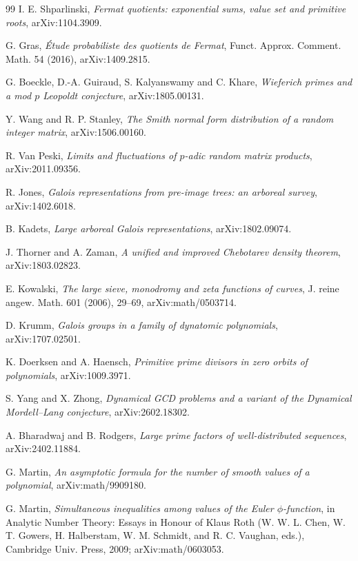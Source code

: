 \documentclass[11pt]{article}
\theoremstyle{definition}
\begin{document}
\begin{thebibliography}{99}
 I. E. Shparlinski,
\emph{Fermat quotients: exponential sums, value set and primitive roots},
arXiv:1104.3909.

 G. Gras,
\emph{\'Etude probabiliste des quotients de Fermat},
Funct. Approx. Comment. Math. 54 (2016), arXiv:1409.2815.

 G. Boeckle, D.-A. Guiraud, S. Kalyanswamy and C. Khare,
\emph{Wieferich primes and a mod $p$ Leopoldt conjecture}, arXiv:1805.00131.

 Y. Wang and R. P. Stanley,
\emph{The Smith normal form distribution of a random integer matrix}, arXiv:1506.00160.

 R. Van Peski,
\emph{Limits and fluctuations of $p$-adic random matrix products}, arXiv:2011.09356.

 R. Jones,
\emph{Galois representations from pre-image trees: an arboreal survey},
arXiv:1402.6018.

 B. Kadets,
\emph{Large arboreal Galois representations}, arXiv:1802.09074.

 J. Thorner and A. Zaman,
\emph{A unified and improved Chebotarev density theorem}, arXiv:1803.02823.

 E. Kowalski,
\emph{The large sieve, monodromy and zeta functions of curves},
J. reine angew. Math. 601 (2006), 29--69, arXiv:math/0503714.

 D. Krumm,
\emph{Galois groups in a family of dynatomic polynomials}, arXiv:1707.02501.

 K. Doerksen and A. Haensch,
\emph{Primitive prime divisors in zero orbits of polynomials}, arXiv:1009.3971.

 S. Yang and X. Zhong,
\emph{Dynamical GCD problems and a variant of the Dynamical Mordell--Lang conjecture},
arXiv:2602.18302.

 A. Bharadwaj and B. Rodgers,
\emph{Large prime factors of well-distributed sequences}, arXiv:2402.11884.

 G. Martin,
\emph{An asymptotic formula for the number of smooth values of a polynomial},
arXiv:math/9909180.

 G. Martin,
\emph{Simultaneous inequalities among values of the Euler $\phi$-function},
in Analytic Number Theory: Essays in Honour of Klaus Roth (W. W. L. Chen, W. T. Gowers, H. Halberstam, W. M. Schmidt, and R. C. Vaughan, eds.), Cambridge Univ. Press, 2009; arXiv:math/0603053.


\end{thebibliography}
\end{document}
